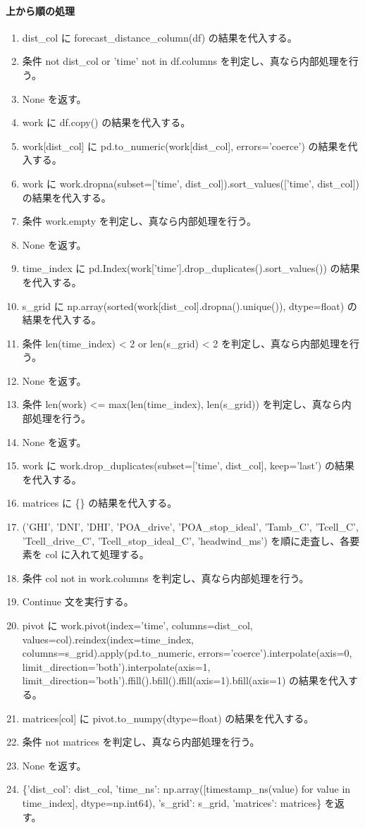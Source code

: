 \documentclass[a4paper,11pt]{article}
\begin{document}
            \paragraph{上から順の処理}
            \begin{enumerate}[leftmargin=1.8em]
            \item dist\_col に forecast\_distance\_column(df) の結果を代入する。
\item 条件 not dist\_col or 'time' not in df.columns を判定し、真なら内部処理を行う。
\item   None を返す。
\item work に df.copy() の結果を代入する。
\item work[dist\_col] に pd.to\_numeric(work[dist\_col], errors='coerce') の結果を代入する。
\item work に work.dropna(subset=['time', dist\_col]).sort\_values(['time', dist\_col]) の結果を代入する。
\item 条件 work.empty を判定し、真なら内部処理を行う。
\item   None を返す。
\item time\_index に pd.Index(work['time'].drop\_duplicates().sort\_values()) の結果を代入する。
\item s\_grid に np.array(sorted(work[dist\_col].dropna().unique()), dtype=float) の結果を代入する。
\item 条件 len(time\_index) < 2 or len(s\_grid) < 2 を判定し、真なら内部処理を行う。
\item   None を返す。
\item 条件 len(work) <= max(len(time\_index), len(s\_grid)) を判定し、真なら内部処理を行う。
\item   None を返す。
\item work に work.drop\_duplicates(subset=['time', dist\_col], keep='last') の結果を代入する。
\item matrices に \{\} の結果を代入する。
\item ('GHI', 'DNI', 'DHI', 'POA\_drive', 'POA\_stop\_ideal', 'Tamb\_C', 'Tcell\_C', 'Tcell\_drive\_C', 'Tcell\_stop\_ideal\_C', 'headwind\_ms') を順に走査し、各要素を col に入れて処理する。
\item   条件 col not in work.columns を判定し、真なら内部処理を行う。
\item     Continue 文を実行する。
\item   pivot に work.pivot(index='time', columns=dist\_col, values=col).reindex(index=time\_index, columns=s\_grid).apply(pd.to\_numeric, errors='coerce').interpolate(axis=0, limit\_direction='both').interpolate(axis=1, limit\_direction='both').ffill().bfill().ffill(axis=1).bfill(axis=1) の結果を代入する。
\item   matrices[col] に pivot.to\_numpy(dtype=float) の結果を代入する。
\item 条件 not matrices を判定し、真なら内部処理を行う。
\item   None を返す。
\item \{'dist\_col': dist\_col, 'time\_ns': np.array([timestamp\_ns(value) for value in time\_index], dtype=np.int64), 's\_grid': s\_grid, 'matrices': matrices\} を返す。
            \end{enumerate}
\end{document}
